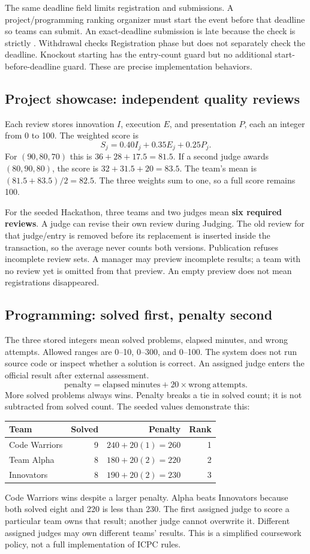 \documentclass[12pt]{article}
\begin{document}
The same deadline field limits registration and submissions. A project/programming ranking organizer must start the event before that deadline so teams can submit. An exact-deadline submission is late because the check is strictly . Withdrawal checks Registration phase but does not separately check the deadline. Knockout starting has the entry-count guard but no additional start-before-deadline guard. These are precise implementation behaviors.

\subsection{Project showcase: independent quality reviews}
Each review stores innovation $I$, execution $E$, and presentation $P$, each an integer from 0 to 100. The weighted score is
\[ S_j = 0.40 I_j + 0.35 E_j + 0.25 P_j. \]
For $(90,80,70)$ this is $36+28+17.5=81.5$. If a second judge awards $(80,90,80)$, the score is $32+31.5+20=83.5$. The team's mean is $(81.5+83.5)/2=82.5$. The three weights sum to one, so a full score remains 100.

For the seeded Hackathon, three teams and two judges mean \textbf{six required reviews}. A judge can revise their own review during Judging. The old review for that judge/entry is removed before its replacement is inserted inside the transaction, so the average never counts both versions. Publication refuses incomplete review sets. A manager may preview incomplete results; a team with no review yet is omitted from that preview. An empty preview does not mean registrations disappeared.

\subsection{Programming: solved first, penalty second}
The three stored integers mean solved problems, elapsed minutes, and wrong attempts. Allowed ranges are 0--10, 0--300, and 0--100. The system does not run source code or inspect whether a solution is correct. An assigned judge enters the official result after external assessment.
\[ \mathrm{penalty} = \mathrm{elapsed\ minutes} + 20\times\mathrm{wrong\ attempts}. \]
More solved problems always wins. Penalty breaks a tie in solved count; it is not subtracted from solved count. The seeded values demonstrate this:
\begin{tabularx}{\linewidth}{Yrrr}\toprule Team & Solved & Penalty & Rank\\\midrule
Code Warriors & 9 & $240+20(1)=260$ & 1\\
Team Alpha & 8 & $180+20(2)=220$ & 2\\
Innovators & 8 & $190+20(2)=230$ & 3\\\bottomrule\end{tabularx}
Code Warriors wins despite a larger penalty. Alpha beats Innovators because both solved eight and 220 is less than 230. The first assigned judge to score a particular team owns that result; another judge cannot overwrite it. Different assigned judges may own different teams' results. This is a simplified coursework policy, not a full implementation of ICPC rules.
\end{document}
